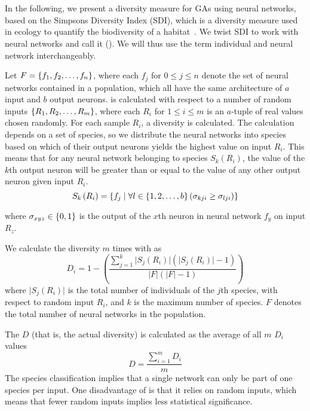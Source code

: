 \section{\di{}}
In the following, we present a diversity measure for GAs using neural networks, based on the Simpsons Diversity Index (SDI), which is a diversity measure used in ecology to quantify the biodiversity of a habitat~\cite{simpson1949measurement}. We twist SDI to work with neural networks and call it \di{} (\dia{}). We will thus use the term individual and neural network interchangeably.

Let $F = \left\{ f_1, f_2, \dots, f_n \right\}$, where each $f_j$ for $0 \leq j \leq n$ denote the set of neural networks contained in a population, which all have the same architecture of $a$ input and $b$ output neurons. \dia{} is calculated with respect to a number of random inputs $\left\{ R_1, R_2, \dots, R_m \right\}$, where each $R_i$ for $1 \leq i \leq m$ is an $a$-tuple of real values chosen randomly. For each sample $R_i$, a diversity is calculated. The calculation depends on a set of species, so we distribute the neural networks into species based on which of their output neurons yields the highest value on input $R_i$. This means that for any neural network belonging to species $S_k(R_i)$, the value of the $k$th output neuron will be greater than or equal to the value of any other output neuron given input $R_i$.%
%
\begin{equation*}\label{eq:species}
  S_k\left(R_i\right) = \left\{ f_j \mid \forall l \in \left\{ 1, 2, \dots, b \right\} \left(\sigma_{kji} \geq \sigma_{lji}\right) \right\}
\end{equation*}
%

where $\sigma_{xyz} \in \left\{ 0, 1 \right\}$ is the output of the $x$th neuron in neural network $f_y$ on input $R_z$.

We calculate the diversity $m$ times with \dia{} as
%
\begin{equation*}\label{eq:sdi}
  D_i = 1 - \left(\frac{\sum_{j=1}^{k}\lvert S_j\left(R_i\right)\rvert\left(\lvert S_j\left(R_i\right)\rvert - 1\right)}{\lvert F\rvert \left(\lvert F\rvert - 1\right)}\right) 
\end{equation*}
%
where $\lvert S_j(R_i)\rvert$ is the total number of individuals of the $j$th species, with respect to random input $R_i$, and $k$ is the maximum number of species. $F$ denotes the total number of neural networks in the population. 

The \dia{} $D$ (that is, the actual diversity) is calculated as the average of all $m$ $D_i$ values
%
\[D =\frac{\sum_{i=1}^m{D_i}}{m}\]
%
The species classification implies that a single network can only be part of one species per input. One disadvantage of \dia{} is that it relies on random inputs, which means that fewer random inputs implies less statistical significance.
